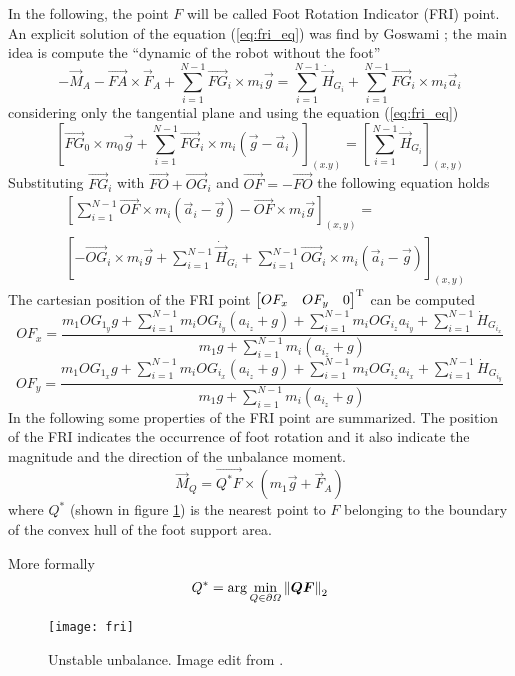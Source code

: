 In the following, the point $F$ will be called Foot Rotation Indicator (FRI) point.
An explicit solution of the equation (\ref{eq:fri_eq}) was find by Goswami \cite{Goswami1999};
the main idea is compute the ``dynamic of the robot without the foot''
\[
-\vec{M}_A - \vec{FA} \times \vec{F}_A + \sum_{i=1}^{N-1} {\vec{FG}_i \times m_i \vec{g}} = \sum_{i=1}^{N-1}
\dot{\vec{H}}_{G_i} + \sum_{i=1}^{N-1} {\vec{FG}_i \times m_i \vec{a}_i}
\]
considering only the tangential plane and using the equation (\ref{eq:fri_eq})
\[
\left[\vec{FG}_0 \times m_0 \vec{g} + \sum_{i=1}^{N-1}\vec{FG}_i \times m_i (\vec{g}-\vec{a}_i)\right]_{(x.y)} = \left[ \sum_{i=1}^{N-1} \dot{\vec{H}}_{G_i} \right]_{(x,y)}
\]
Substituting $\vec{FG}_i$ with $\vec{FO} + \vec{OG}_i$ and $\vec{OF} = -\vec{FO}$ the following
equation holds
\[
\begin{split}
  & \left[ \sum_{i=1}^{N-1} \vec{OF} \times m_i (\vec{a}_i - \vec{g}) -  \vec{OF} \times m_i \vec{g} \right]_{(x,y)} =\\
 & \left[ -\vec{OG}_i \times m_i \vec{g} + \sum_{i=1}^{N-1} \dot{\vec{H}}_{G_i} + \sum_{i=1}^{N-1} \vec{OG}_i \times m_i (\vec{a}_i - \vec{g})  \right]_{(x,y)}
\end{split}
\]
The cartesian position of the FRI point $\begin{bmatrix}OF_x & OF_y & 0 \end{bmatrix} ^{\mathrm{T}}$
can be computed
\[
OF_x = \frac{m_1 OG_{1_y} g + \sum_{i=1}^{N-1} m_i OG_{i_y}(a_{i_z} + g) + \sum_{i=1}^{N-1} m_i OG_{i_z} a_{i_y} + \sum_{i=1}^{N-1} \dot{H}_{G_{i_x}}}{m_1 g + \sum_{i=1}^{N-1} m_i ( a_{i_z} + g)}
\]
\[
OF_y = \frac{m_1 OG_{1_x} g + \sum_{i=1}^{N-1} m_i OG_{i_x}(a_{i_z} + g) + \sum_{i=1}^{N-1} m_i OG_{i_z} a_{i_x} + \sum_{i=1}^{N-1} \dot{H}_{G_{i_y}}}{m_1 g + \sum_{i=1}^{N-1} m_i ( a_{i_z} + g)}
\]
In the following some properties of the FRI point are summarized.
The position of the FRI indicates the occurrence of foot rotation and it also indicate the magnitude
and the direction of the unbalance moment.
\[
\vec{M}_{Q} = \vec{Q^*F} \times (m_1 \vec{g} + \vec{F}_A)
\]
where $Q^*$ (shown in figure \ref{fig:fri}) is the nearest point to $F$  belonging to the boundary
of the convex hull of the foot support area.
\par
More formally
\[
Q^* = \arg \min_{Q \in \partial \Omega}\left\lVert\boldsymbol{QF}\right\rVert_2
\]
\begin{figure}[!ht]
  \centering
  \texttt{[image: fri]}
  \caption{Unstable unbalance. Image edit from \cite{Vukobratov2004}. \label{fig:fri}}
\end{figure}
